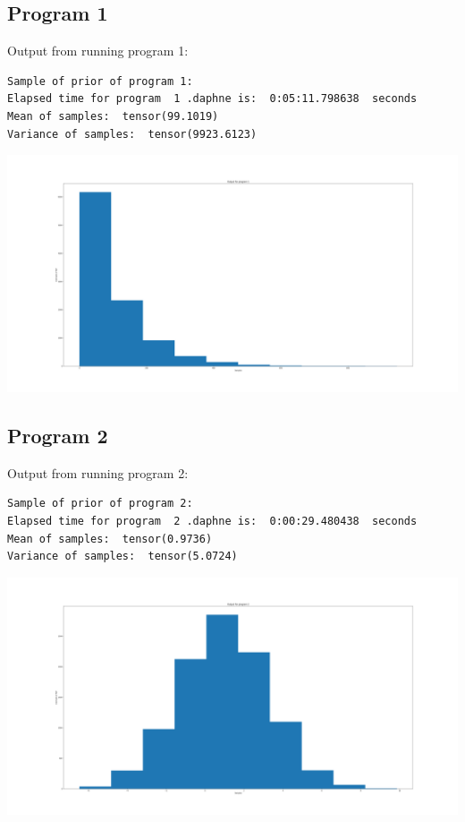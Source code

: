 \documentclass[]{article}
\begin{document}
\subsection{Program 1}
Output from running program 1:
\begin{verbatim}
Sample of prior of program 1:
Elapsed time for program  1 .daphne is:  0:05:11.798638  seconds
Mean of samples:  tensor(99.1019)
Variance of samples:  tensor(9923.6123)
\end{verbatim}
\begin{center}
	\includegraphics[width=\linewidth]{Figures/P1Hist.png}
\end{center}

\subsection{Program 2}
Output from running program 2:
\begin{verbatim}
Sample of prior of program 2:
Elapsed time for program  2 .daphne is:  0:00:29.480438  seconds
Mean of samples:  tensor(0.9736)
Variance of samples:  tensor(5.0724)
\end{verbatim}
\begin{center}
	\includegraphics[width=\linewidth]{Figures/P2Hist.png}
\end{center}
\end{document}
